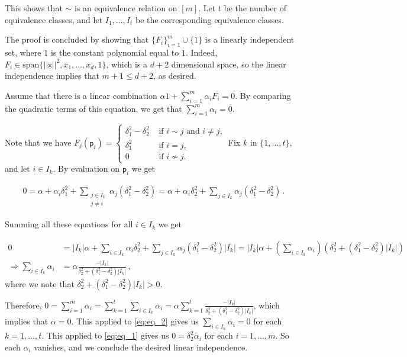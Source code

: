 \documentclass[kulak]{tplt}
\theoremstyle{definition}
\newcommand{\vx}{\mathsf{x}}
\newcommand{\vp}{\mathsf{p}}
\newcommand{\spn}{\mathrm{span}}
\begin{document}
\begin{enumerate}
\begin{enumerate}
This shows that $\sim $ is an equivalence relation on $[m]$.
Let $t$ be the number of equivalence classes, and let $I_1, \ldots, I_t $ be the corresponding equivalence classes.

The proof is concluded by showing that $\{F_i\}_{i=1}^m \cup \{ 1 \}$ is a linearly independent set, where $1$ is the constant polynomial equal to $1$.
Indeed, $F_i \in \spn \{ ||\vx||^2, x_1, \ldots, x_d, 1\}$, which is a $d+2$ dimensional space, so the linear independence implies that $m+1 \leq d+2$, as desired.

Assume that there is a linear combination $\alpha 1 + \sum_{i=1}^m \alpha_i F_i = 0 $.
By comparing the quadratic terms of this equation, we get that $\sum_{i=1}^m \alpha_i = 0$.

Note that we have 
$F_j(\vp_i) = \begin{cases} \delta_1^2 - \delta_2^2& \text{ if $i\sim j$ and $i\neq j$,} \\ \delta_1^2& \text{ if $i = j$,}\\ 0& \text{ if $i \not\sim j$.} \end{cases}$
Fix $k$ in $\{1, \ldots, t \}$, and let $i \in I_k$.
By evaluation on $\vp_i$ we get

\begin{equation}\label{eq:eq_1}
\begin{split}
0 = \alpha + \alpha_i \delta_1^2 + \sum_{\substack{j\in I_k \\ j \neq i}} \alpha_j (\delta_1^2-\delta_2^2) = \alpha + \alpha_i \delta_2^2 + \sum_{j\in I_k } \alpha_j (\delta_1^2-\delta_2^2)\, . 
\end{split}
\end{equation}

Summing all these equations for all $i\in I_k$ we get

\begin{equation}\label{eq:eq_2}
\begin{split}
0 &= |I_k|\alpha + \sum_{i\in I_k} \alpha_i \delta_2^2 + \sum_{j\in I_k } \alpha_j (\delta_1^2-\delta_2^2)|I_k| = |I_k|\alpha + \left( \sum_{i\in I_k} \alpha_i \right) \left( \delta_2^2 + (\delta_1^2-\delta_2^2)|I_k|  \right) \\
\Rightarrow \sum_{i \in I_k} \alpha_i &= \alpha \frac{-|I_k|}{\delta_2^2 + (\delta_1^2-\delta_2^2)|I_k|} \, ,
\end{split}
\end{equation}
where we note that $\delta_2^2 + (\delta_1^2-\delta_2^2)|I_k| > 0 $.

Therefore, $0 = \sum_{i=1}^m \alpha_i = \sum_{k = 1}^t \sum_{i \in I_k} \alpha_i = \alpha \sum_{k=1}^t \frac{-|I_k|}{\delta_2^2 + (\delta_1^2-\delta_2^2)|I_k|}$, which implies that $\alpha = 0$.
This applied to \eqref{eq:eq_2} gives us $\sum_{i \in I_k} \alpha_i  = 0$ for each $k = 1, \ldots, t$.
This applied to \eqref{eq:eq_1} gives us $ 0 = \delta_2^2 \alpha_ i$ for each $i = 1, \ldots, m$.
So each $\alpha_i $ vanishes, and we conclude the desired linear independence.


\end{enumerate}
\end{enumerate}
\end{document}
